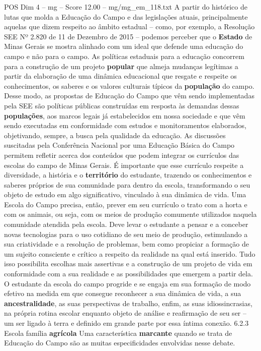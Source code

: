 \begin{textsample}{POS Dim 4 – mg – Score 12.00 – mg/mg\_em\_118.txt}
A partir do histórico de lutas que molda a Educação do Campo e das legislações atuais, principalmente aquelas que dizem respeito ao âmbito estadual – como, por exemplo, a Resolução SEE Nº 2.820 de 11 de Dezembro de 2015 – podemos perceber que o \textbf{Estado} de Minas Gerais se mostra alinhado com um ideal que defende uma educação do campo e não para o campo.
As políticas estaduais para a educação concorrem para a construção de um projeto \textbf{popular} que almeja mudanças legítimas a partir da elaboração de uma dinâmica educacional que resgate e respeite os conhecimentos, os saberes e os valores culturais típicos da \textbf{população} do campo.
Desse modo, as propostas de Educação do Campo que vêm sendo implementadas pela SEE são políticas públicas construídas em resposta às demandas dessas \textbf{populações}, aos marcos legais já estabelecidos em nossa sociedade e que vêm sendo executadas em conformidade com estudos e monitoramentos elaborados, objetivando, sempre, a busca pela qualidade da educação.
As discussões suscitadas pela Conferência Nacional por uma Educação Básica do Campo permitem refletir acerca dos conteúdos que podem integrar os currículos das escolas do campo de Minas Gerais.
É importante que esse currículo respeite a diversidade, a história e o \textbf{território} do estudante, trazendo os conhecimentos e saberes próprios de sua comunidade para dentro da escola, transformando o seu objeto de estudo em algo significativo, vinculado à sua dinâmica de vida.
Uma Escola do Campo precisa, então, prever em seu currículo o trato com a horta e com os animais, ou seja, com os meios de produção comumente utilizados naquela comunidade atendida pela escola.
Deve levar o estudante a pensar e a conceber novas tecnologias para o uso cotidiano de seu meio de produção, estimulando a sua criatividade e a resolução de problemas, bem como propiciar a formação de um sujeito consciente e crítico a respeito da realidade na qual está inserido.
Tudo isso possibilita escolhas mais assertivas e a construção de um projeto de vida em conformidade com a sua realidade e as possibilidades que emergem a partir dela.
O estudante da escola do campo progride e se engaja em sua formação de modo efetivo na medida em que consegue reconhecer a sua dinâmica de vida, a sua \textbf{ancestralidade}, as suas perspectivas de trabalho, enfim, as suas idiossincrasias, na própria rotina escolar enquanto objeto de análise e reafirmação de seu ser – um ser ligado à terra e definido em grande parte por essa íntima conexão. 6.2.3 Escola família \textbf{agrícola} Uma característica \textbf{marcante} quando se trata de Educação do Campo são as muitas especificidades envolvidas nesse debate.

\end{textsample}
